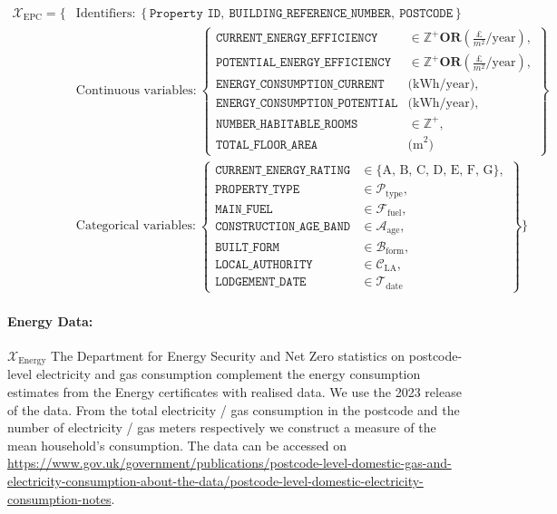 \documentclass[12pt]{article}
\begin{document}
\begin{align*}
\mathcal{X}_{\text{EPC}} = \Big\{
  &\text{Identifiers:}~
    \left\{
      \texttt{Property ID},~
      \texttt{BUILDING\_REFERENCE\_NUMBER},~
      \texttt{POSTCODE}
    \right\}
  \\[0.8em]
  &\text{Continuous variables:}~
    \left\{
      \begin{array}{ll}
        \texttt{CURRENT\_ENERGY\_EFFICIENCY} & \in \mathbb{Z}^+ \textbf{OR} (\frac{\text{£}}{m^2}/\text{year}), \\
        \texttt{POTENTIAL\_ENERGY\_EFFICIENCY} & \in \mathbb{Z}^+ \textbf{OR} (\frac{\text{£}}{m^2}/\text{year}), \\
        \texttt{ENERGY\_CONSUMPTION\_CURRENT} & \text{(kWh/year)}, \\
        \texttt{ENERGY\_CONSUMPTION\_POTENTIAL} & \text{(kWh/year)}, \\
        \texttt{NUMBER\_HABITABLE\_ROOMS} & \in \mathbb{Z}^+, \\
        \texttt{TOTAL\_FLOOR\_AREA} & \text{(m}^2\text{)}
      \end{array}
    \right\}
  \\[0.8em]
  &\text{Categorical variables:}~
    \left\{
      \begin{array}{ll}
        \texttt{CURRENT\_ENERGY\_RATING} & \in \{\text{A, B, C, D, E, F, G}\}, \\
        \texttt{PROPERTY\_TYPE} & \in \mathcal{P}_{\text{type}}, \\
        \texttt{MAIN\_FUEL} & \in \mathcal{F}_{\text{fuel}}, \\
        \texttt{CONSTRUCTION\_AGE\_BAND} & \in \mathcal{A}_{\text{age}}, \\
        \texttt{BUILT\_FORM} & \in \mathcal{B}_{\text{form}}, \\
        \texttt{LOCAL\_AUTHORITY} & \in \mathcal{C}_{\text{LA}}, \\
        \texttt{LODGEMENT\_DATE} & \in \mathcal{T}_{\text{date}}
      \end{array}
    \right\}
\Big\}
\end{align*}
\fi 


\paragraph{Energy Data:} $\mathcal{X}_{\text{Energy}}$ \quad The Department for Energy Security and Net Zero statistics on postcode-level electricity and gas consumption complement the energy consumption estimates from the Energy certificates with realised data. We use the 2023 release of the data. From the total electricity / gas consumption in the postcode and the number of electricity / gas meters respectively we construct a measure of the mean household's consumption. The data can be accessed on \url{https://www.gov.uk/government/publications/postcode-level-domestic-gas-and-electricity-consumption-about-the-data/postcode-level-domestic-electricity-consumption-notes}.
\end{document}
